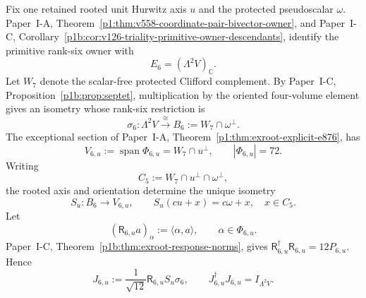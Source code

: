 \documentclass[12pt,a4paper]{article}
\begin{document}
\begin{theorem}
\label{p8:thm:v2181-e6-curvature-response-map}
Fix one retained rooted unit Hurwitz axis \(u\) and the protected
pseudoscalar \(\omega\).  Paper~I-A,
Theorem~\ref{p1:thm:v558-coordinate-pair-bivector-owner}, and Paper~I-C,
Corollary~\ref{p1b:cor:v126-triality-primitive-owner-descendants}, identify the
primitive rank-six owner with
\[
 E_6=(\Lambda^2V)_{\mathbb C}.
\]
Let \(W_7\) denote the scalar-free protected Clifford complement.  By
Paper~I-C, Proposition~\ref{p1b:prop:septet}, multiplication by the oriented
four-volume element gives an isometry whose rank-six restriction is
\[
 \sigma_6:\Lambda^2V\xrightarrow{\ \cong\ }
 B_6:=W_7\cap\omega^\perp.
\]
The exceptional section of Paper~I-A,
Theorem~\ref{p1:thm:exroot-explicit-e876}, has
\[
 V_{6,u}:=\operatorname{span}\Phi_{6,u}=W_7\cap u^\perp,
 \qquad |\Phi_{6,u}|=72.
\]
Writing
\[
 C_5:=W_7\cap u^\perp\cap\omega^\perp,
\]
the rooted axis and orientation determine the unique isometry
\begin{equation}
\label{p8:eq:v2181-axis-pseudoscalar-swap}
 \boxed{
 S_u:B_6\longrightarrow V_{6,u},\qquad
 S_u(cu+x)=c\omega+x,\quad x\in C_5.}
\end{equation}
Let
\[
 (\mathsf R_{6,u}a)_\alpha:=\langle\alpha,a\rangle,
 \qquad \alpha\in\Phi_{6,u}.
\]
Paper~I-C, Theorem~\ref{p1b:thm:exroot-response-norms}, gives
\(
 \mathsf R_{6,u}^\dagger\mathsf R_{6,u}=12P_{6,u}
\).
Hence
\begin{equation}
\label{p8:eq:v2181-e6-polar-isometry}
 \boxed{
 J_{6,u}:=\frac1{\sqrt{12}}\mathsf R_{6,u}S_u\sigma_6,
 \qquad
 J_{6,u}^\dagger J_{6,u}=I_{\Lambda^2V}.}
\end{equation}


\end{theorem}
\end{document}
